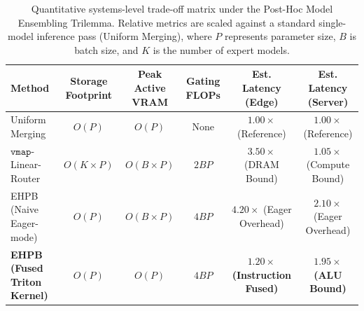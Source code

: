 \documentclass{article}
\theoremstyle{plain}
\theoremstyle{definition}
\theoremstyle{remark}
\begin{document}
\begin{table}[t]
\caption{Quantitative systems-level trade-off matrix under the Post-Hoc Model Ensembling Trilemma. Relative metrics are scaled against a standard single-model inference pass (Uniform Merging), where $P$ represents parameter size, $B$ is batch size, and $K$ is the number of expert models.}
\label{tab:latency_tradeoffs}
\vskip 0.15in
\begin{center}
\begin{small}
\begin{sc}
\begin{tabular}{lccccc}
\toprule
Method & Storage Footprint & Peak Active VRAM & Gating FLOPs & Est. Latency (Edge) & Est. Latency (Server) \\
\midrule
Uniform Merging & $O(P)$ & $O(P)$ & None & $1.00\times$ (Reference) & $1.00\times$ (Reference) \\
$\mathtt{vmap}$-Linear-Router & $O(K \times P)$ & $O(B \times P)$ & $2 B P$ & $3.50\times$ (DRAM Bound) & $1.05\times$ (Compute Bound) \\
EHPB (Naive Eager-mode) & $O(P)$ & $O(B \times P)$ & $4 B P$ & $4.20\times$ (Eager Overhead) & $2.10\times$ (Eager Overhead) \\
\textbf{EHPB (Fused Triton Kernel)} & \textbf{$O(P)$} & \textbf{$O(P)$} & \textbf{$4 B P$} & \textbf{$1.20\times$ (Instruction Fused)} & \textbf{$1.95\times$ (ALU Bound)} \\
\bottomrule
\end{tabular}
\end{sc}
\end{small}
\end{center}
\vskip -0.1in
\end{table}
\end{document}
